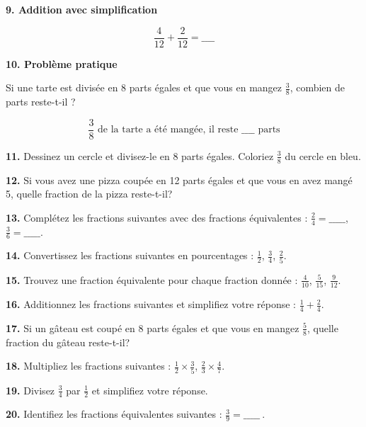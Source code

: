 \documentclass{article}
\begin{document}
\begin{tcolorbox}[colback=purple!10!white, colframe=yellow!75!black, title=\textcolor{white}{Exercices d'Application}, sharp corners=south, boxrule=0.8mm]
    \textbf{9. Addition avec simplification}
    
    \[
    \frac{4}{12} + \frac{2}{12} = \_\_\_\_
    \]
    
    \vspace{10pt}
    
    \textbf{10. Problème pratique}
    
    Si une tarte est divisée en 8 parts égales et que vous en mangez \(\frac{3}{8}\), combien de parts reste-t-il ?
    
    \[
    \frac{3}{8} \text{ de la tarte a été mangée, il reste } \_\_\_\_ \text{ parts}
    \]
\end{tcolorbox}

\vspace{0.2cm}
\begin{tcolorbox}[colback=purple!10!white, colframe=yellow!75!black, title=\textcolor{white}{Exercices d'Application}, sharp corners=south, boxrule=0.8mm]
    \textbf{11.} Dessinez un cercle et divisez-le en 8 parts égales. Coloriez \(\frac{3}{8}\) du cercle en bleu.

    \textbf{12.} Si vous avez une pizza coupée en 12 parts égales et que vous en avez mangé 5, quelle fraction de la pizza reste-t-il?

    \textbf{13.} Complétez les fractions suivantes avec des fractions équivalentes : \(\frac{2}{4} = \_\_\_\_\_\), \(\frac{3}{6} = \_\_\_\_\_\).

    \textbf{14.} Convertissez les fractions suivantes en pourcentages : \(\frac{1}{2}\), \(\frac{3}{4}\), \(\frac{2}{5}\).

    \textbf{15.} Trouvez une fraction équivalente pour chaque fraction donnée : \(\frac{4}{10}\), \(\frac{5}{15}\), \(\frac{9}{12}\).

    \textbf{16.} Additionnez les fractions suivantes et simplifiez votre réponse : \(\frac{1}{4} + \frac{2}{4}\).

    \textbf{17.} Si un gâteau est coupé en 8 parts égales et que vous en mangez \(\frac{5}{8}\), quelle fraction du gâteau reste-t-il?

    \textbf{18.} Multipliez les fractions suivantes : \(\frac{1}{2} \times \frac{3}{5}\), \(\frac{2}{3} \times \frac{4}{7}\).

    \textbf{19.} Divisez \(\frac{3}{4}\) par \(\frac{1}{2}\) et simplifiez votre réponse.

    \textbf{20.} Identifiez les fractions équivalentes suivantes : \(\frac{3}{9} = \_\_\_\_\_\ \).
\end{tcolorbox}
\end{document}
